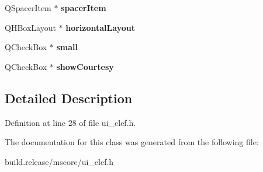 \begin{DoxyCompactItemize}
Q\+Spacer\+Item $\ast$ {\bfseries spacer\+Item}
\item 
\mbox{\label{class_ui___clef_a28c60c29c39986d8f4421d4235dbffff}} 
Q\+H\+Box\+Layout $\ast$ {\bfseries horizontal\+Layout}
\item 
\mbox{\label{class_ui___clef_a76bbf79c467e0508c773fddc052f28d8}} 
Q\+Check\+Box $\ast$ {\bfseries small}
\item 
\mbox{\label{class_ui___clef_a3cab9276c112b73c15a3b23adfabce10}} 
Q\+Check\+Box $\ast$ {\bfseries show\+Courtesy}
\end{DoxyCompactItemize}


\subsection{Detailed Description}


Definition at line 28 of file ui\+\_\+clef.\+h.



The documentation for this class was generated from the following file\+:\begin{DoxyCompactItemize}
\item 
build.\+release/mscore/ui\+\_\+clef.\+h\end{DoxyCompactItemize}
